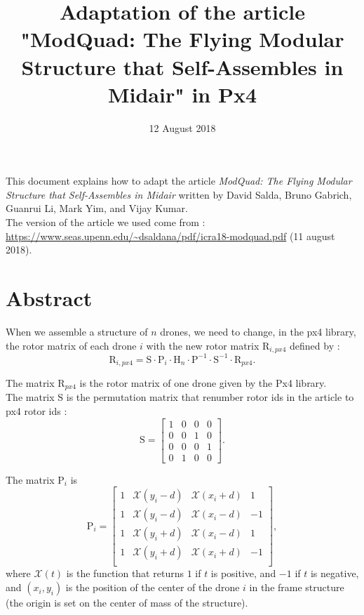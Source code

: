 \documentclass[a4paper]{article}
\title{Adaptation of the article "ModQuad: The Flying Modular Structure that Self-Assembles in Midair" in Px4}           %
\date{12 August 2018}                       %
\newcommand{\UB}[1]{ \bm{\mathrm{#1}} }
\begin{document}
\maketitle                    %


This document explains how to adapt the article {\it ModQuad: The Flying Modular Structure that Self-Assembles in Midair }
written by David Salda, Bruno Gabrich, Guanrui Li, Mark Yim, and Vijay Kumar. \\

The version of the article we used come from :
\url{https://www.seas.upenn.edu/~dsaldana/pdf/icra18-modquad.pdf}
(11 august 2018). %


\section{Abstract}

When we assemble a structure of $n$ drones, we need to change, in the px4 library, the rotor matrix of each drone $i$ 
with the new rotor matrix $\UB{R}_{i,px4}$ defined by :
$$
\UB{R}_{i,px4}
=
\UB{S}
\cdot
\UB{P}_i
\cdot
\UB{H}_n
\cdot
\UB{P}^{-1}
\cdot
\UB{S}^{-1}
\cdot
\UB{R}_{px4}.
$$

The matrix $\UB{R}_{px4}$ is the rotor matrix of one drone given by the Px4 library.\\

The matrix $\UB{S}$ is the permutation matrix that renumber rotor ids in the article to px4 rotor ids :
$$
\UB{S}=
\left[
\begin{array}{cccc}
1 & 0 & 0 & 0 \\
0 & 0 & 1 & 0 \\
0 & 0 & 0 & 1 \\
0 & 1 & 0 & 0
\end{array}
\right].
$$

The matrix $\UB{P}_i$ is
$$
\UB{P}_i
=
\left[
\begin{array}{cccc}
1 & \mathcal{X}(y_{i} - d) & \mathcal{X}(x_{i} + d) &  1  \\
1 & \mathcal{X}(y_{i} - d) & \mathcal{X}(x_{i} - d) & -1  \\
1 & \mathcal{X}(y_{i} + d) & \mathcal{X}(x_{i} - d) &  1  \\
1 & \mathcal{X}(y_{i} + d) & \mathcal{X}(x_{i} + d) & -1  \\
\end{array}
\right],
$$
where $\mathcal{X}(t)$ is the function that returns $1$ if $t$ is positive, and $-1$ if $t$ is negative, and $(x_i, y_i)$ is the position of the center of the drone $i$ in the frame structure (the origin is set on the center of mass of the structure).\\
\end{document}
